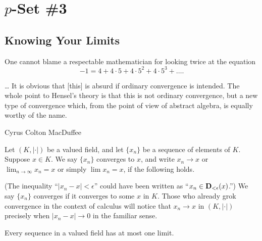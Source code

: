 %
%
%
\chapter*{$p$-Set \#3}
\label{chap:chap3}


\section*{Knowing Your Limits}

\epigraph{One cannot blame a respectable mathematician for looking
twice at the equation $$-1 = 4 + 4\cdot5 + 4 \cdot5^2 + 4\cdot5^3 +\dots.$$ 

\dots\! It is obvious that [this] is absurd if ordinary convergence is intended. The whole point to Hensel's theory is that this is not ordinary convergence, but a new type of convergence which, from the point of view of abstract algebra, is equally worthy of the name.}{Cyrus Colton MacDuffee}
\setlength{\epigraphwidth}{0.45\textwidth}  

Let $(K,|\cdot|)$ be a valued field, and let $\{x_n\}$ be a sequence of elements of $K$. Suppose $x \in K$. We say \textsf{$\{x_n\}$ converges to $x$}, and write $x_n \to x$ or $\lim_{n\to\infty} x_n = x$ or simply $\lim x_n = x$, if the following holds.


(The inequality ``$|x_n-x|<\epsilon$'' could have been written as ``$x_n \in \mathbf{D}_{<\epsilon}(x)$.'') We say $\{x_n\}$ \textsf{converges}  if it converges to some $x$ in $K$. Those who already grok convergence in the context of calculus will notice that  $x_n \to x$ in $(K,|\cdot|)$ precisely when $|x_n-x|\to 0$ in the familiar sense.

\begin{prob}\label{prob:28} Every sequence in a valued field has at most one limit.
\end{prob}


